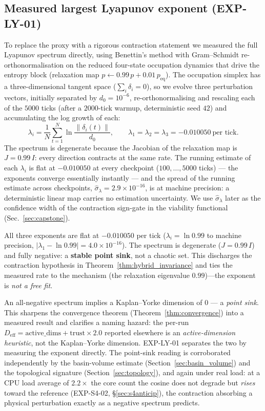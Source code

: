 \documentclass[11pt, a4paper]{article}
\begin{document}
\subsection*{Measured largest Lyapunov exponent (EXP-LY-01)}
\label{sec:ly01}

To replace the proxy with a rigorous contraction statement we measured the
full Lyapunov spectrum directly, using Benettin's method with Gram--Schmidt
re-orthonormalisation on the reduced four-state occupation dynamics that drive
the entropy block (relaxation map $p \leftarrow 0.99\,p + 0.01\,p_\text{eq}$).
The occupation simplex has a three-dimensional tangent space
($\sum_i \delta_i = 0$), so we evolve three perturbation vectors, initially
separated by $d_0 = 10^{-6}$, re-orthonormalising and rescaling each of the
$5000$ ticks (after a $2000$-tick warmup, deterministic seed $42$) and
accumulating the log growth of each:
\begin{equation}
  \lambda_i
    = \frac{1}{N}\sum_{t=1}^{N} \ln\frac{\lVert \delta_i(t)\rVert}{d_0},
  \qquad
  \lambda_1 = \lambda_2 = \lambda_3 = -0.010050 \ \text{per tick}.
  \label{eq:lambda_max}
\end{equation}
The spectrum is degenerate because the Jacobian of the relaxation map is
$J = 0.99\,I$: every direction contracts at the same rate. The running estimate
of each $\lambda_i$ is flat at $-0.010050$ at every checkpoint
($100,\dots,5000$ ticks) --- the exponents converge essentially instantly ---
and the spread of the running estimate across checkpoints,
$\hat{\sigma}_\lambda = 2.9\times 10^{-16}$, is at machine precision: a
deterministic linear map carries no estimation uncertainty. We use
$\hat{\sigma}_\lambda$ later as the confidence width of the contraction
sign-gate in the viability functional (Sec.~\ref{sec:capstone}).

All three exponents are flat at $-0.010050$ per tick
($\lambda_i = \ln 0.99$ to machine precision,
$\lvert \lambda_1 - \ln 0.99\rvert = 4.0\times 10^{-16}$).
The spectrum is degenerate ($J = 0.99\,I$) and fully negative:
a \textbf{stable point sink}, not a chaotic set.  This discharges the
contraction hypothesis in Theorem~\ref{thm:hybrid_invariance}
and ties the measured rate to the mechanism (the relaxation eigenvalue
$0.99$)---the exponent is \emph{not a free fit}.

An all-negative spectrum implies a Kaplan--Yorke dimension of $0$ --- a
\emph{point sink}. This sharpens the convergence theorem
(Theorem~\ref{thm:convergence}) into a measured result and clarifies a naming
hazard: the per-run $D_\text{eff} = \text{active\_dims} + \text{trust}\times 2.0$
reported elsewhere is an \emph{active-dimension heuristic}, not the
Kaplan--Yorke dimension. EXP-LY-01 separates the two by measuring the
exponent directly. The point-sink reading is corroborated independently by the
basin-volume estimate (Section~\ref{sec:basin_volume}) and the topological
signature (Section~\ref{sec:topology}), and again under real load: at a CPU load
average of $2.2\times$ the core count the cosine does not degrade but \emph{rises}
toward the reference (EXP-S4-02, \S\ref{sec:s4anticip}), the contraction absorbing a
physical perturbation exactly as a negative spectrum predicts.
\end{document}
